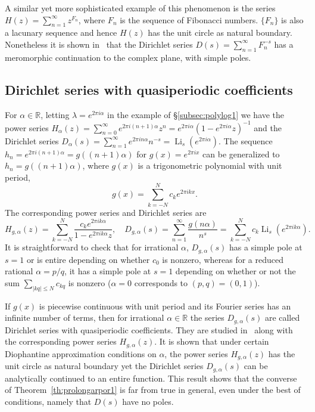 \documentclass[11pt,a4paper]{amsart}
\newcommand{\R}{\mathbb{R}}
\newcommand{\Li}{\operatorname{Li}}
\theoremstyle{plain}
\theoremstyle{plain}
\theoremstyle{plain}
\theoremstyle{definition}
\theoremstyle{remark}
\begin{document}
A similar yet more sophisticated example of this phenomenon is the series $H(z) = \sum_{n=1}^{\infty} z^{F_{n}}$, where $F_{n}$ is the sequence of Fibonacci numbers. $\{F_{n}\}$ is also a lacunary sequence and hence $H(z)$ has the unit circle as natural boundary. Nonetheless it is shown in~\cite{FibonacciDirichlet} that the Dirichlet series $D(s) = \sum_{n=1}^{\infty} F_{n}^{-s}$ has a meromorphic continuation to the complex plane, with simple poles.


\subsection{Dirichlet series with quasiperiodic coefficients}
\label{subsec:quasiperiodic}

For $\alpha \in \R$, letting $\lambda = e^{2 \pi i \alpha}$ in the example of \S\ref{subsec:polylog1} we have the power series $H_{\alpha}(z) = \sum_{n=0}^{\infty} e^{2 \pi i (n+1) \alpha} z^{n} = e^{2 \pi i \alpha} (1 - e^{2 \pi i \alpha} z)^{-1}$ and the Dirichlet series $D_{\alpha}(s) = \sum_{n=1}^{\infty} e^{2 \pi i n \alpha} n^{-s} = \Li_{s}(e^{2 \pi i \alpha})$. The sequence $h_{n} = e^{2 \pi i (n+1) \alpha} = g((n+1)\alpha)$ for $g(x) = e^{2 \pi i x}$ can be generalized to  $h_{n}=g((n+1)\alpha)$, where $g(x)$ is a trigonometric polynomial with unit period,
\[
  g(x) = \sum_{k=-N}^N c_k e^{2\pi ikx}.
\]
The corresponding power series and Dirichlet series are
\[
  H_{g,\alpha}(z) = \sum_{k=-N}^{N} \frac{c_{k} e^{2 \pi i k \alpha}}{1 - e^{2 \pi i k \alpha} z},
  \quad
  D_{g,\alpha}(s) = \sum_{n=1}^{\infty}\frac{g(n\alpha)}{n^{s}}
  = \sum_{k=-N}^{N} c_{k} \Li_{s}(e^{2 \pi i k \alpha}).
\]
It is straightforward to check that for irrational $\alpha$, $D_{g,\alpha}(s)$ has a simple pole at $s=1$ or is entire depending on whether $c_{0}$ is nonzero, whereas for a reduced rational $\alpha = p/q$, it has a simple pole at $s=1$ depending on whether or not the sum $\sum_{|kq|\leq N} c_{kq}$ is nonzero ($\alpha = 0$ corresponds to $(p,q) = (0,1)$).

If $g(x)$ is piecewise continuous with unit period and its Fourier series has an infinite number of terms, then for irrational $\alpha \in \R$ the series $D_{g,\alpha}(s)$ are called Dirichlet series with quasiperiodic coefficients. They are studied in~\cite{Knill-Lesieutre} along with the corresponding power series $H_{g,\alpha}(z)$. It is shown that under certain Diophantine approximation conditions on $\alpha$, the power series $H_{g,\alpha}(z)$ has the unit circle as natural boundary yet the Dirichlet series $D_{g,\alpha}(s)$ can be analytically continued to an entire function. This result shows that the converse of Theorem~\ref{th:prolongarpor1} is far from true in general, even under the best of conditions, namely that $D(s)$ have no poles.
\end{document}

